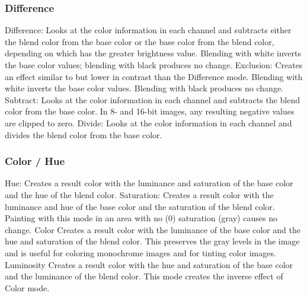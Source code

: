 \documentclass{beamer}
\begin{document}
\begin{frame}
	\frametitle{Difference}
	\begin{outline}
		\1 Difference:
		\2 Looks at the color information in each channel and subtracts either the blend color from the base color or the base color from the blend color, depending on which has the greater brightness value. Blending with white inverts the base color values; blending with black produces no change.
		\1 Exclusion:
		\2 Creates an effect similar to but lower in contrast than the Difference mode. Blending with white inverts the base color values. Blending with black produces no change.		\1 Subtract:
		\2 Looks at the color information in each channel and subtracts the blend color from the base color. In 8- and 16-bit images, any resulting negative values are clipped to zero.
		\1 Divide:  
		\2 Looks at the color information in each channel and divides the blend color from the base color.
	\end{outline}
\end{frame}

\begin{frame}
	\frametitle{Color / Hue}
	\begin{outline}
		\1 Hue:  
		\2 Creates a result color with the luminance and saturation of the base color and the hue of the blend color.
		\1 Saturation:  
		\2 Creates a result color with the luminance and hue of the base color and the saturation of the blend color. Painting with this mode in an area with no (0) saturation (gray) causes no change.		
		\1 Color
		\2 Creates a result color with the luminance of the base color and the hue and saturation of the blend color. This preserves the gray levels in the image and is useful for coloring monochrome images and for tinting color images.
		\1 Luminosity
		\2 Creates a result color with the hue and saturation of the base color and the luminance of the blend color. This mode creates the inverse effect of Color mode.
	\end{outline}
\end{frame}
\end{document}
